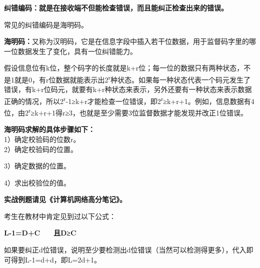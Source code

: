 \textbf{纠错编码：就是在接收端不但能检查错误，而且能纠正检查出来的错误。}

常见的纠错编码是海明码。

\textbf{海明码：}又称为汉明码，它是在信息字段中插入若干位数据，用于监督码字里的哪一位数据发生了变化，具有一位纠错能力。

假设信息位有k位，整个码字的长度就是k+r位；每一位的数据只有两种状态，不是1就是0，有r位数据就能表示出2\textsuperscript{r}种状态。如果每一种状态代表一个码元发生了错误，有k+r位码元，就要有k+r种状态来表示，另外还要有一种状态来表示数据正确的情况，所以{2}\textsuperscript{{r}}{-1≥k+r}才能检查一位错误，即2\textsuperscript{r}≥k+r+1。例如，信息数据有4位，由2\textsuperscript{r}≥k+r+1得r≥3，也就是至少需要3位监督数据才能发现并改正1位错误。

\textbf{海明码求解的具体步骤如下：}\\
1）确定校验码的位数r。\\

2）确定校验码的位置。

3）确定数据的位置。

4）求出校验位的值。

\textbf{{实战例题请见《计算机网络高分笔记》。}}

{考生在教材中肯定见到过以下公式：}

\textbf{L-1=D+C ~ ~且D≥C}

如果要纠正d位错误，说明至少要检测出d位错误（当然可以检测得更多），代入即可得到L-1=d+d，即L=2d+1。
